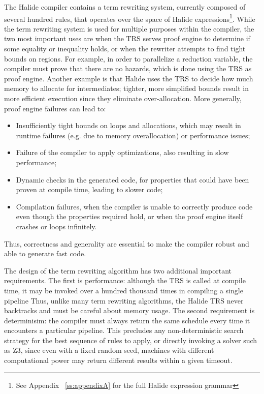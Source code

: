 \documentclass[sigplan,10pt,review,anonymous]{acmart}\settopmatter{printfolios=true,printccs=false,printacmref=false}
\begin{document}
The Halide compiler contains a term rewriting system, currently composed of
several hundred rules, that operates over the space of Halide
expressions\footnote{See Appendix ~\ref{ss:appendixA} for the full Halide
  expression grammar}. While the term rewriting system is used for multiple
purposes within the compiler, the two most important
uses are when the TRS serves proof engine to determine if
some equality or inequality holds, or when the rewriter attempts to find tight
bounds on regions. For example, in order to parallelize a
reduction variable, the compiler must prove that there are no hazards, which is
done using the TRS as proof engine.  Another example is that Halide uses
the TRS to decide how much memory to allocate for intermediates; tighter, more
simplified bounds result in more efficient execution since they eliminate over-allocation.
More generally, proof engine failures can lead to:
\begin{itemize}
\item Insufficiently tight bounds on loops and allocations, which may result in
  runtime failures (e.g. due to memory overallocation) or performance issues;

\item Failure of the compiler to apply optimizations, also resulting in slow performance;

\item Dynamic checks in the generated code, for properties that could have been proven
  at compile time, leading to slower code;

\item Compilation failures, when the compiler is unable to correctly produce code
  even though the properties required hold, or when the proof engine itself crashes
  or loops infinitely.
\end{itemize}
Thus, correctness and generality are essential to make the compiler robust and
able to generate fast code.

The design of the term rewriting algorithm has two additional important
requirements. The first is performance: although the TRS is called at
compile time, it may be invoked over a hundred thousand times in compiling a single pipeline
Thus, unlike many term rewriting algorithms, the Halide TRS
never backtracks and must be careful about memory usage. The second requirement is determinisim: the compiler must
always return the same schedule every time it encounters a particular pipeline.
This precludes any non-deterministic search strategy for the best sequence of
rules to apply, or directly invoking a solver such as Z3, since even with a
fixed random seed, machines with different computational power may return
different results within a given timeout.
\end{document}
